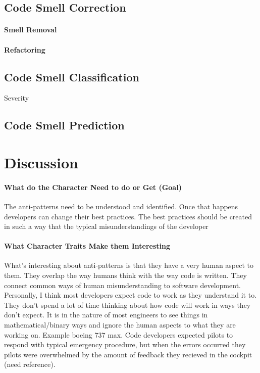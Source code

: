 \documentclass[conference]{IEEEtran}
\begin{document}
\subsection{Code Smell Correction}
\paragraph{Smell Removal}
\paragraph{Refactoring}
\subsection{Code Smell Classification}
Severity
\subsection{Code Smell Prediction}



\section{Discussion}

\paragraph{What do the Character Need to do or Get (Goal)}
The anti-patterns need to be understood and identified.
Once that happens developers can change their best practices.
The best practices should be created in such a way that the typical misunderstandings of the developer


\paragraph{What Character Traits Make them Interesting}
What's interesting about anti-patterns is that they have a very human aspect to them. 
They overlap the way humans think with the way code is written. 
They connect common ways of human misunderstanding to software development. 
Personally, I think most developers expect code to work as they understand it to. 
They don't spend a lot of time thinking about how code will work in ways they don't expect.
It is in the nature of most engineers to see things in mathematical/binary ways and ignore the human aspects to what they are working on.
Example boeing 737 max.
Code developers expected pilots to respond with typical emergency procedure, but when the errors occurred they pilots were overwhelmed by the amount of feedback they recieved in the cockpit (need reference).
\end{document}
